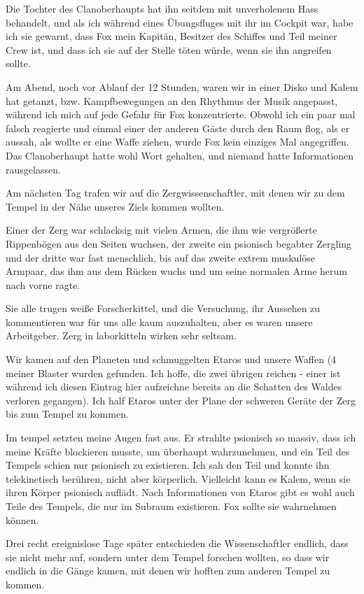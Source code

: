 \documentclass[11pt]{article}
\begin{document}
Die Tochter des Clanoberhaupts hat ihn seitdem mit unverholenem Hass
behandelt, und als ich während eines Übungsfluges mit ihr im Cockpit
war, habe ich sie gewarnt, dass Fox mein Kapitän, Besitzer des Schiffes
und Teil meiner Crew ist, und dass ich sie auf der Stelle töten würde,
wenn sie ihn angreifen sollte.

Am Abend, noch vor Ablauf der 12 Stunden, waren wir in einer Disko und
Kalem hat getanzt, bzw. Kampfbewegungen an den Rhythmus der Musik
angepasst, während ich mich auf jede Gefahr für Fox konzentrierte.
Obwohl ich ein paar mal falsch reagierte und einmal einer der anderen
Gäste durch den Raum flog, als er aussah, als wollte er eine Waffe
ziehen, wurde Fox kein einziges Mal angegriffen. Das Clanoberhaupt hatte
wohl Wort gehalten, und niemand hatte Informationen rausgelassen.

Am nächsten Tag trafen wir auf die Zergwissenschaftler, mit denen wir zu
dem Tempel in der Nähe unseres Ziels kommen wollten.

Einer der Zerg war schlacksig mit vielen Armen, die ihm wie vergrößerte
Rippenbögen aus den Seiten wuchsen, der zweite ein psionisch begabter
Zergling und der dritte war fast menschlich, bis auf das zweite extrem
muskulöse Armpaar, das ihm aus dem Rücken wuchs und um seine normalen
Arme herum nach vorne ragte.

Sie alle trugen weiße Forscherkittel, und die Versuchung, ihr Aussehen
zu kommentieren war für uns alle kaum auszuhalten, aber es waren unsere
Arbeitgeber. Zerg in laborkitteln wirken sehr seltsam.

Wir kamen auf den Planeten und schmuggelten Etaros und unsere Waffen (4
meiner Blaster wurden gefunden. Ich hoffe, die zwei übrigen reichen -
einer ist während ich diesen Eintrag hier aufzeichne bereits an die
Schatten des Waldes verloren gegangen). Ich half Etaros unter der Plane
der schweren Geräte der Zerg bis zum Tempel zu kommen.

Im tempel setzten meine Augen fast aus. Er strahlte psionisch so massiv,
dass ich meine Kräfte blockieren musste, um überhaupt wahrzunehmen, und
ein Teil des Tempels schien nur psionisch zu existieren. Ich sah den
Teil und konnte ihn telekinetisch berühren, nicht aber körperlich.
Vielleicht kann es Kalem, wenn sie ihren Körper psionisch auflädt. Nach
Informationen von Etaros gibt es wohl auch Teile des Tempels, die nur im
Subraum existieren. Fox sollte sie wahrnehmen können.

Drei recht ereignislose Tage später entschieden die Wissenschaftler
endlich, dass sie nicht mehr auf, sondern unter dem Tempel forschen
wollten, so dass wir endlich in die Gänge kamen, mit denen wir hofften
zum anderen Tempel zu kommen.
\end{document}

